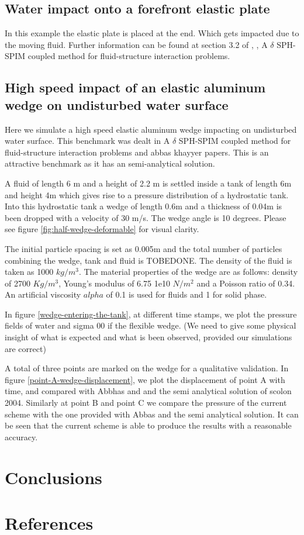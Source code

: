 \documentclass[preprint,12pt]{elsarticle}
\begin{document}
\subsection{Water impact onto a forefront elastic plate}
\label{sec:water-impact-forefront}

In this example the elastic plate is placed at the end. Which gets impacted
due to the moving fluid. Further information can be found at section 3.2 of
\cite{liu2013numerical}, \citet{sun2019fully}, {A $\delta$ SPH-SPIM coupled
  method for fluid-structure interaction problems}.



\subsection{High speed impact of an elastic aluminum wedge on undisturbed
  water surface}
\label{sec:wedge-impact-on-water}

Here we simulate a high speed elastic aluminum wedge impacting on undisturbed
water surface. This benchmark was dealt in
{A $\delta$ SPH-SPIM coupled method for fluid-structure interaction problems} and
{abbas khayyer} papers.
This is an attractive benchmark as it has an semi-analytical solution.

A fluid of length 6 m and a height of 2.2 m is settled inside a tank of length
6m and height 4m which gives rise to a pressure distribution of a hydrostatic
tank. Into this hydrostatic tank a wedge of length 0.6m and a thickness of
0.04m is been dropped with a velocity of 30 m/s. The wedge angle is 10
degrees. Please see figure \ref{fig:half-wedge-deformable} for visual clarity.

The initial particle spacing is set as 0.005m and the total number of
particles combining the wedge, tank and fluid is TOBEDONE. The density of the
fluid is taken as 1000 $kg/m^3$. The material properties of the wedge are as
follows: density of 2700 $Kg/m^3$, Young's modulus of 6.75 1e10 $N/m^2$ and a
Poisson ratio of 0.34. An artificial viscosity $alpha$ of 0.1 is used for
fluids and 1 for solid phase.

In figure \ref{wedge-entering-the-tank}, at different time stamps, we plot the
pressure fields of water and sigma 00 if the flexible wedge. (We need to give
some physical insight of what is expected and what is been observed, provided
our simulations are correct)

A total of three points are marked on the wedge for a qualitative validation.
In figure \ref{point-A-wedge-displacement}, we plot the displacement of point
A with time, and compared with Abbhas and and the semi analytical solution of
scolon 2004. Similarly at point B and point C we compare the pressure of the
current scheme with the one provided with Abbas and the semi analytical
solution. It can be seen that the current scheme is able to produce the
results with a reasonable accuracy.



\section{Conclusions}
\label{sec:conclusions}


\section*{References}


\end{document}
